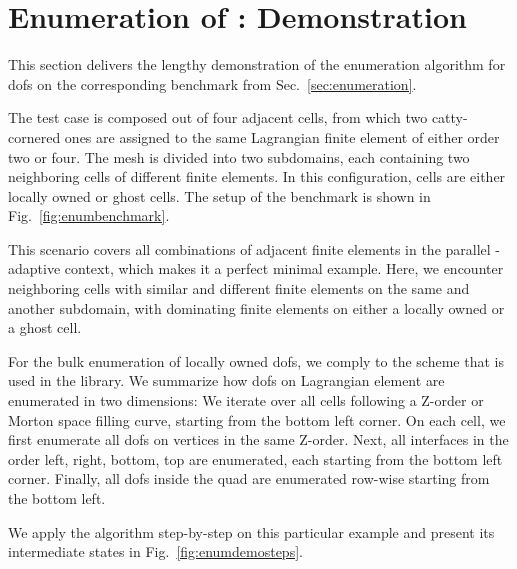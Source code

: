 \chapter{Enumeration of : Demonstration}
\label{app::enumeration}

This section delivers the lengthy demonstration of the enumeration algorithm for \glspl{dof} on the corresponding benchmark from Sec.~\ref{sec:enumeration}.

The test case is composed out of four adjacent cells, from which two catty-cornered ones are assigned to the same Lagrangian finite element of either order two or four. The mesh is divided into two subdomains, each containing two neighboring cells of different finite elements. In this configuration, cells are either locally owned or ghost cells. The setup of the benchmark is shown in Fig.~\ref{fig:enumbenchmark}. %

This scenario covers all combinations of adjacent finite elements in the parallel \hp-adaptive context, which makes it a perfect minimal example. Here, we encounter neighboring cells with similar and different finite elements on the same and another subdomain, with dominating finite elements on either a locally owned or a ghost cell.

For the bulk enumeration of locally owned \glspl{dof}, we comply to the scheme that is used in the \dealii{} library. We summarize how \glspl{dof} on Lagrangian element \textcite{dealiifeq} are enumerated in two dimensions: We iterate over all cells following a Z-order or Morton space filling curve, starting from the bottom left corner. On each cell, we first enumerate all \glspl{dof} on vertices in the same Z-order. Next, all interfaces in the order left, right, bottom, top are enumerated, each starting from the bottom left corner. Finally, all \glspl{dof} inside the quad are enumerated row-wise starting from the bottom left.

We apply the algorithm step-by-step on this particular example and present its intermediate states in Fig.~\ref{fig:enumdemosteps}.

